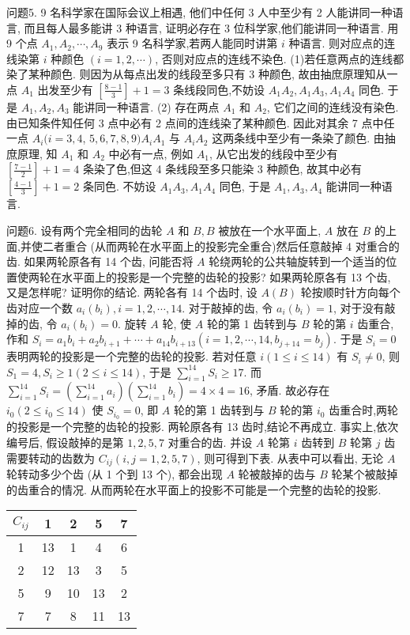 问题5. 9 名科学家在国际会议上相遇, 他们中任何 3 人中至少有 2 人能讲同一种语言, 而且每人最多能讲 3 种语言, 证明必存在 3 位科学家,他们能讲同一种语言.
用 9 个点 $A_1, A_2, \cdots, A_9$ 表示 9 名科学家,若两人能同时讲第 $i$ 种语言.
则对应点的连线染第 $i$ 种颜色 $(i=1,2, \cdots)$, 否则对应点的连线不染色.
(1)若任意两点的连线都染了某种颜色.
则因为从每点出发的线段至多只有 3 种颜色, 故由抽庶原理知从一点 $A_1$ 出发至少有 $\left[\frac{8-1}{3}\right]+ 1=3$ 条线段同色,不妨设 $A_1 A_2, A_1 A_3, A_1 A_4$ 同色.
于是 $A_1, A_2, A_3$ 能讲同一种语言.
(2) 存在两点 $A_1$ 和 $A_2$, 它们之间的连线没有染色.
由已知条件知任何 3 点中必有 2 点间的连线染了某种颜色.
因此对其余 7 点中任一点 $A_i(i=3,4$, $5,6,7,8,9) A_i A_1$ 与 $A_i A_2$ 这两条线中至少有一条染了颜色.
由抽庶原理, 知 $A_1$ 和 $A_2$ 中必有一点, 例如 $A_1$, 从它出发的线段中至少有 $\left[\frac{7-1}{2}\right]+1=4$ 条染了色,但这 4 条线段至多只能染 3 种颜色, 故其中必有 $\left[\frac{4-1}{3}\right]+1=2$ 条同色.
不妨设 $A_1 A_3, A_1 A_4$ 同色, 于是 $A_1, A_3, A_4$ 能讲同一种语言.



问题6. 设有两个完全相同的齿轮 $A$ 和 $B, B$ 被放在一个水平面上, $A$ 放在 $B$ 的上面,并使二者重合 (从而两轮在水平面上的投影完全重合)然后任意敲掉 4 对重合的齿.
如果两轮原各有 14 个齿, 问能否将 $A$ 轮绕两轮的公共轴旋转到一个适当的位置使两轮在水平面上的投影是一个完整的齿轮的投影?
如果两轮原各有 13 个齿, 又是怎样呢? 证明你的结论.
两轮各有 14 个齿时, 设 $A(B)$ 轮按顺时针方向每个齿对应一个数 $a_i\left(b_i\right), i=1,2, \cdots, 14$. 对于敲掉的齿, 令 $a_i\left(b_i\right)=1$, 对于没有敲掉的齿, 令 $a_i\left(b_i\right)=0$. 旋转 $A$ 轮, 使 $A$ 轮的第 1 齿转到与 $B$ 轮的第 $i$ 齿重合, 作和 $S_i=a_1 b_i+a_2 b_{i+1}+\cdots+a_{14} b_{i+13}\left(i=1,2, \cdots, 14, b_{j+14}=b_j\right)$. 于是 $S_i=0$ 表明两轮的投影是一个完整的齿轮的投影.
若对任意 $i(1 \leqslant i \leqslant 14)$ 有 $S_i \neq 0$, 则 $S_1=4, S_i \geqslant 1(2 \leqslant i \leqslant 14)$, 于是 $\sum_{i=1}^{14} S_i \geqslant 17$. 而 $\sum_{i=1}^{14} S_i= \left(\sum_{i=1}^{14} a_i\right)\left(\sum_{i=1}^{14} b_i\right)=4 \times 4=16$, 矛盾.
故必存在 $i_0\left(2 \leqslant i_0 \leqslant 14\right)$ 使 $S_{i_0}=0$, 即 $A$ 轮的第 1 齿转到与 $B$ 轮的第 $i_0$ 齿重合时,两轮的投影是一个完整的齿轮的投影.
两轮原各有 13 齿时,结论不再成立.
事实上,依次编号后, 假设敲掉的是第 $1,2,5,7$ 对重合的齿.
并设 $A$ 轮第 $i$ 齿转到 $B$ 轮第 $j$ 齿需要转动的齿数为 $C_{i j}(i, j=1,2,5,7)$, 则可得到下表.
从表中可以看出, 无论 $A$ 轮转动多少个齿 (从 1 个到 13 个), 都会出现 $A$ 轮被敲掉的齿与 $B$ 轮某个被敲掉的齿重合的情况.
从而两轮在水平面上的投影不可能是一个完整的齿轮的投影.
\begin{tabular}{|c|c|c|c|c|}
\hline$C_{i j}$ & 1 & 2 & 5 & 7 \\
\hline 1 & 13 & 1 & 4 & 6 \\
\hline 2 & 12 & 13 & 3 & 5 \\
\hline 5 & 9 & 10 & 13 & 2 \\
\hline 7 & 7 & 8 & 11 & 13 \\
\hline
\end{tabular}


